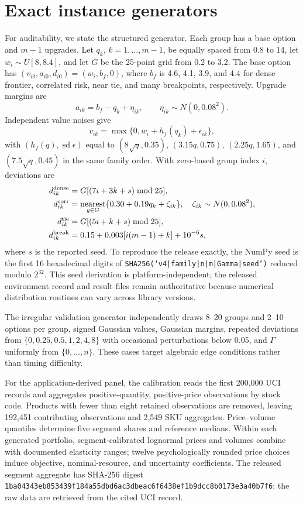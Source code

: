\documentclass[11pt]{article}
\theoremstyle{plain}
\theoremstyle{definition}
\theoremstyle{remark}
\begin{document}
\section{Exact instance generators}\label{app:generators}

For auditability, we state the structured generator.  Each group has a base option and $m-1$ upgrades.  Let $q_k$, $k=1,\ldots,m-1$, be equally spaced from 0.8 to 14, let $w_i\sim U[8,8.4]$, and let
$G$ be the 25-point grid from 0.2 to 3.2.  The base option has
$(v_{i0},a_{i0},d_{i0})=(w_i,b_f,0)$, where
$b_f$ is 4.6, 4.1, 3.9, and 4.4 for dense frontier, correlated risk, near tie, and many breakpoints, respectively.  Upgrade margins are
\[
a_{ik}=b_f-q_k+\eta_{ik},\qquad \eta_{ik}\sim N(0,0.08^2).
\]
Independent value noises give
\[
v_{ik}=\max\{0,w_i+h_f(q_k)+\epsilon_{ik}\},
\]
with $(h_f(q),\operatorname{sd}\epsilon)$ equal to
$(8\sqrt q,0.35)$, $(3.15q,0.75)$, $(2.25q,1.65)$, and
$(7.5\sqrt q,0.45)$ in the same family order.  With zero-based group index $i$, deviations are
\begin{align*}
d_{ik}^{\rm dense}&=G[(7i+3k+s)\bmod25],\\
d_{ik}^{\rm corr}&=\operatorname*{nearest}_{g\in G}
\{0.30+0.19q_k+\zeta_{ik}\},\quad \zeta_{ik}\sim N(0,0.08^2),\\
d_{ik}^{\rm tie}&=G[(5i+k+s)\bmod25],\\
d_{ik}^{\rm break}&=0.15+0.003[i(m-1)+k]+10^{-6}s,
\end{align*}
where $s$ is the reported seed.  To reproduce the release exactly, the NumPy seed is the first 16 hexadecimal digits of
\texttt{SHA256(`v4|family|n|m|Gamma|seed')} reduced modulo $2^{32}$.  This seed derivation is platform-independent; the released environment record and result files remain authoritative because numerical distribution routines can vary across library versions.

The irregular validation generator independently draws 8--20 groups and 2--10 options per group, signed Gaussian values, Gaussian margins, repeated deviations from $\{0,0.25,0.5,1,2,4,8\}$ with occasional perturbations below 0.05, and $\Gamma$ uniformly from $\{0,\ldots,n\}$.  These cases target algebraic edge conditions rather than timing difficulty.

For the application-derived panel, the calibration reads the first 200,000 UCI records and aggregates positive-quantity, positive-price observations by stock code.  Products with fewer than eight retained observations are removed, leaving 192,451 contributing observations and 2,549 SKU aggregates.  Price--volume quantiles determine five segment shares and reference medians.  Within each generated portfolio, segment-calibrated lognormal prices and volumes combine with documented elasticity ranges; twelve psychologically rounded price choices induce objective, nominal-resource, and uncertainty coefficients.  The released segment aggregate has SHA-256 digest \nolinkurl{1ba04343eb853439f184a55dbd6ac3dbeac6f6438ef1b9dcc8b0173e3a40b7f6}; the raw data are retrieved from the cited UCI record.
\end{document}
